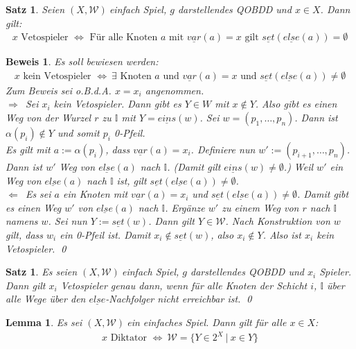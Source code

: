 \documentclass[ngerman]{scrartcl}
\theoremstyle{custom}
\newtheorem{ms}[mdef]{Satz}
\newtheorem{ml}[mdef]{Lemma}
\newtheorem*{bw}{Beweis}
\newcommand{\0}{\mathbf{0}}
\newcommand{\1}{\mathbf{L}}
\newcommand{\el}{\underline{else}}
\newcommand{\var}{\underline{var}}
\newcommand{\eins}{\underline{eins}}
\newcommand{\set}{\underline{set}}
\newcommand{\sg}{$(X,\mathcal{W})~$}
\newcommand{\W}{\mathcal{W}}
\begin{document}
\begin{ms}
Seien \sg einfach Spiel, $g$ darstellendes QOBDD und $x \in X$. Dann
gilt:
\begin{align*}
x \text{ Vetospieler } \Leftrightarrow \text{ F\"ur alle Knoten } a
\text{ mit } \var(a) = x \text{ gilt } \set(\el(a)) = \emptyset
\end{align*}
\end{ms}

\begin{bw}
Es soll bewiesen werden:
\begin{align*}
x \text{ kein Vetospieler } \Leftrightarrow~ \exists \text{ Knoten } a
\text{ und } \var(a) = x \text{ und } \set(\el(a)) \not = \emptyset
\end{align*}
Zum Beweis sei o.B.d.A. $x = x_i$ angenommen.\\

\glqq $\Rightarrow$\grqq~Sei $x_i$ kein Vetospieler. Dann gibt es
$Y \in W$ mit $x \not \in Y$. Also gibt es einen Weg von der Wurzel
$r$ zu $\mathds{I}$ mit $Y = \eins(w)$. Sei $w =
(p_1,\dots,p_n)$. Dann ist $\alpha(p_i) \not \in Y$ und somit $p_i$
0-Pfeil.\\
Es gilt mit $a:= \alpha(p_i)$, dass $\var(a) = x_i$. Definiere nun $w':=
(p_{i+1}, \dots, p_n)$. Dann ist $w'$ Weg von $\el(a)$ nach
$\mathds{I}$. (Damit gilt $\eins(w) \not = \emptyset$.) Weil $w'$ ein
Weg von $\el(a)$ nach $\mathds{I}$ ist, gilt $\set(\el(a)) \not =
\emptyset$.\\

\glqq $\Leftarrow$\grqq~Es sei $a$ ein Knoten mit $\var(a) = x_i$ und
$\set(\el(a)) \not = \emptyset$. Damit gibt es einen Weg $w'$ von $\el(a)$
nach $\mathds{I}$. Erg\"anze $w'$ zu einem Weg von $r$ nach
$\mathds{I}$ namens $w$. Sei nun $Y := \set(w)$. Dann gilt $Y \in
\W$. Nach Konstruktion von $w$ gilt, dass $w_i$ ein 0-Pfeil ist. Damit
$x_i \not \in \set(w)$, also $x_i \not \in Y$. Also ist $x_i$ kein
Vetospieler. \qed
\end{bw}

\begin{ms}
Es seien \sg einfach Spiel, $g$ darstellendes QOBDD und $x_i$
Spieler. Dann gilt $x_i$ Vetospieler genau dann, wenn f\"ur alle
Knoten der Schicht $i$, $\mathds{I}$ \"uber alle Wege
\"uber den $\el$-Nachfolger nicht erreichbar ist.
\qed
\end{ms}

\begin{ml}
Es sei \sg ein einfaches Spiel. Dann gilt f\"ur alle $x \in X$:
\begin{align*}
x \text{ Diktator } \Leftrightarrow~ \W = \{Y \in 2^X ~\vert~ x \in
Y\}
\end{align*}
\end{ml}
\end{document}
